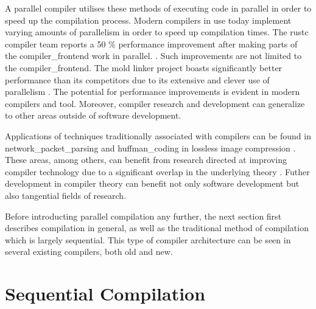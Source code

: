 A parallel compiler utilises these methods of executing code in parallel
in order to speed up the compilation process. Modern compilers in use today
implement varying amounts of parallelism in order to speed up compilation
times. The \gls{rustc} compiler team reports a 50 \% performance improvement
after making parts of the \gls{compiler_frontend} work in parallel.
\citep{nicholas_nethercote_faster_2023}. Such improvements are not limited to
the \gls{compiler_frontend}. The mold \gls{linker} project boasts significantly
better performance than its competitors due to its extensive and clever use
of parallelism \citep{rui_ueyama_design_nodate}. The potential for performance
improvements is evident in modern compilers and tool. Moreover, compiler
research and development can generalize to other areas outside of software
development.

Applications of techniques traditionally associated with compilers can
be found in \gls{network_packet_parsing} \citep{wang_hyperscan_2019,
roesch_snort_1999} and \gls{huffman_coding} in lossless image compression
\citep{howard_parallel_1996}. These areas, among others, can benefit from
research directed at improving compiler technology due to a significant
overlap in the underlying theory \citep{mytkowicz_data-parallel_2014}. Futher
development in compiler theory can benefit not only software development but
also tangential fields of research.

Before introducting parallel compilation any further, the next section
first describes compilation in general, as well as the traditional method of
compilation which is largely sequential. This type of compiler architecture can
be seen in several existing compilers, both old and new.

\section{Sequential Compilation}

